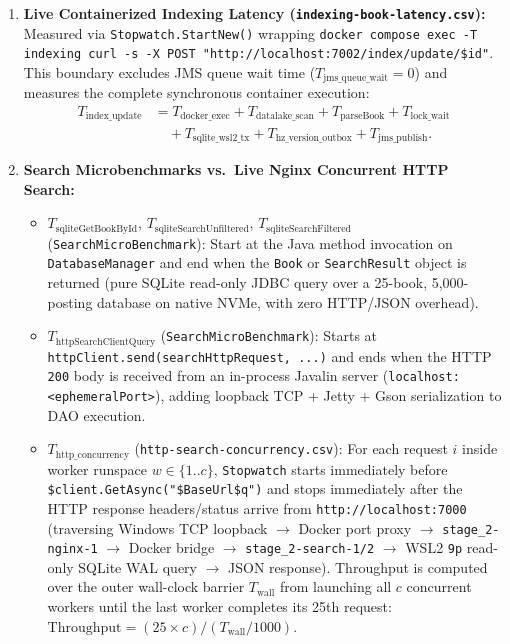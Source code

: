 \documentclass[10pt,a4paper]{article}
\begin{document}
\begin{enumerate}[leftmargin=*,nosep]
\begin{itemize}[nosep]
    \end{itemize}
    \item \textbf{Live Containerized Indexing Latency (\texttt{indexing-book-latency.csv}):}
    Measured via \texttt{Stopwatch.StartNew()} wrapping \texttt{docker compose exec -T indexing curl -s -X POST "http://localhost:7002/index/update/\$id"}. This boundary excludes JMS queue wait time ($T_{\text{jms\_queue\_wait}} = 0$) and measures the complete synchronous container execution:
    \begin{align*}
        T_{\text{index\_update}} &= T_{\text{docker\_exec}} + T_{\text{datalake\_scan}} + T_{\text{parseBook}} + T_{\text{lock\_wait}} \\
                                 &\quad + T_{\text{sqlite\_wsl2\_tx}} + T_{\text{hz\_version\_outbox}} + T_{\text{jms\_publish}}.
    \end{align*}
    \item \textbf{Search Microbenchmarks vs.\ Live Nginx Concurrent HTTP Search:}
    \begin{itemize}[nosep]
        \item $T_{\text{sqliteGetBookById}}$, $T_{\text{sqliteSearchUnfiltered}}$, $T_{\text{sqliteSearchFiltered}}$ (\texttt{SearchMicroBenchmark}): Start at the Java method invocation on \texttt{DatabaseManager} and end when the \texttt{Book} or \texttt{SearchResult} object is returned (pure SQLite read-only JDBC query over a 25-book, 5,000-posting database on native NVMe, with zero HTTP/JSON overhead).
        \item $T_{\text{httpSearchClientQuery}}$ (\texttt{SearchMicroBenchmark}): Starts at \texttt{httpClient.send(searchHttpRequest, ...)} and ends when the HTTP \texttt{200} body is received from an in-process Javalin server (\texttt{localhost:<ephemeralPort>}), adding loopback TCP + Jetty + Gson serialization to DAO execution.
        \item $T_{\text{http\_concurrency}}$ (\texttt{http-search-concurrency.csv}): For each request $i$ inside worker runspace $w \in \{1..c\}$, \texttt{Stopwatch} starts immediately before \texttt{\$client.GetAsync("\$BaseUrl\$q")} and stops immediately after the HTTP response headers/status arrive from \texttt{http://localhost:7000} (traversing Windows TCP loopback $\to$ Docker port proxy $\to$ \texttt{stage\_2-nginx-1} $\to$ Docker bridge $\to$ \texttt{stage\_2-search-1/2} $\to$ WSL2 \texttt{9p} read-only SQLite WAL query $\to$ JSON response). Throughput is computed over the outer wall-clock barrier $T_{\text{wall}}$ from launching all $c$ concurrent workers until the last worker completes its 25th request: $\text{Throughput} = (25 \times c) / (T_{\text{wall}} / 1000)$.
    \end{itemize}
\end{enumerate}
\end{document}
